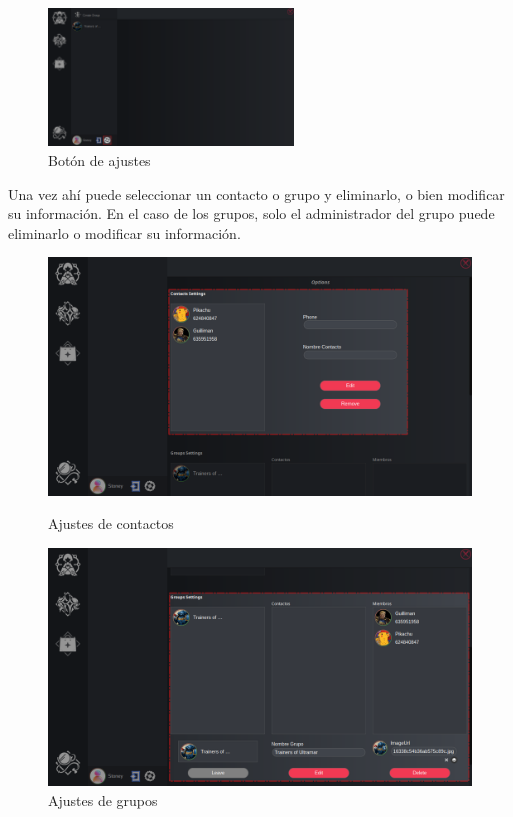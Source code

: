 \begin{figure}[H]
    \centering
    \includegraphics[width=0.58\textwidth]{images/manualDeUsuario/EditarContactos&Grupos1.png}
    \caption*{Botón de ajustes}
\end{figure}

Una vez ahí puede seleccionar un contacto o grupo y eliminarlo, o bien modificar su información.
En el caso de los grupos, solo el administrador del grupo puede eliminarlo o modificar su información.

\begin{figure}[H]
    \centering
    \begin{minipage}[b]{0.48\textwidth}
        \centering
        \includegraphics[width=\textwidth]{images/manualDeUsuario/EditarContactos&Grupos2.png}
        \caption*{Ajustes de contactos}
    \end{minipage}
    \hfill
    \begin{minipage}[b]{0.48\textwidth}
        \centering
        \includegraphics[width=\textwidth]{images/manualDeUsuario/EditarContactos&Grupos3.png}
        \caption*{Ajustes de grupos}
    \end{minipage}
\end{figure}


